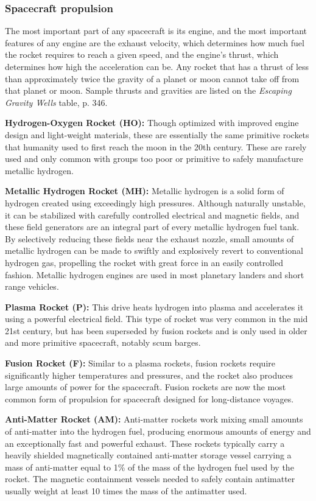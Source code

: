 {{\subsubsection{Spacecraft propulsion} 

The most important part of any spacecraft is its engine, and the most important features of any engine are the exhaust velocity, which determines how much fuel the rocket requires to reach a given speed, and the engine’s thrust, which determines how high the acceleration can be. Any rocket that has a thrust of less than approximately twice the gravity of a planet or moon cannot take off from that planet or moon. Sample thrusts and gravities are listed on the \emph{Escaping Gravity Wells} table, p. 346. 

\textbf{Hydrogen-Oxygen Rocket (HO):} Though optimized with improved engine design and light-weight materials, these are essentially the same primitive rockets that humanity used to first reach the moon in the 20th century. These are rarely used and only common with groups too poor or primitive to safely manufacture metallic hydrogen. 

\textbf{Metallic Hydrogen Rocket (MH):} Metallic hydrogen is a solid form of hydrogen created using exceedingly high pressures. Although naturally unstable, it can be stabilized with carefully controlled electrical and magnetic fields, and these field generators are an integral part of every metallic hydrogen fuel tank. By selectively reducing these fields near the exhaust nozzle, small amounts of metallic hydrogen can be made to swiftly and explosively revert to conventional hydrogen gas, propelling the rocket with great force in an easily controlled fashion. Metallic hydrogen engines are used in most planetary landers and short range vehicles. 

\textbf{Plasma Rocket (P):} This drive heats hydrogen into plasma and accelerates it using a powerful electrical field. This type of rocket was very common in the mid 21st century, but has been superseded by fusion rockets and is only used in older and more primitive spacecraft, notably scum barges. 

\textbf{Fusion Rocket (F):} Similar to a plasma rockets, fusion rockets require significantly higher temperatures and pressures, and the rocket also produces large amounts of power for the spacecraft. Fusion rockets are now the most common form of propulsion for spacecraft designed for long-distance voyages. 

\textbf{Anti-Matter Rocket (AM):} Anti-matter rockets work mixing small amounts of anti-matter into the hydrogen fuel, producing enormous amounts of energy and an exceptionally fast and powerful exhaust. These rockets typically carry a heavily shielded magnetically contained anti-matter storage vessel carrying a mass of anti-matter equal to 1\% of the mass of the hydrogen fuel used by the rocket. The magnetic containment vessels needed to safely contain antimatter usually weight at least 10 times the mass of the antimatter used. 

}}

